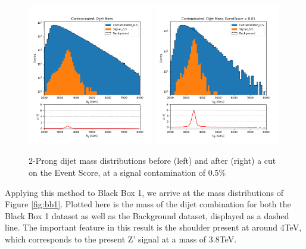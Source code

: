 \documentclass[letterpaper,11pt]{article}
\begin{document}
\begin{figure}[h!]
	\begin{center}
		\includegraphics[width=0.49\textwidth]{imgs/2Prong_Contaminated_0p5_JJ_Mass_Multi.png}
		\includegraphics[width=0.49\textwidth]{imgs/2Prong_Contaminated_0p5_JJ_Mass_EventScore0p65_Multi.png}
	\end{center}
	\caption{2-Prong dijet mass distributions before (left) and after (right) a cut on the Event Score, at a signal contamination of 0.5\%}
	\label{fig:m_JJ}
\end{figure}

Applying this method to Black Box 1, we arrive at the mass distributions of Figure {\ref{fig:bb1}}. Plotted here is the mass of the dijet combination for both the Black Box 1 dataset as well as the Background dataset, displayed as a dashed line. The important feature in this result is the shoulder present at around 4TeV, which corresponds to the present Z' signal at a mass of 3.8TeV. 
\end{document}
